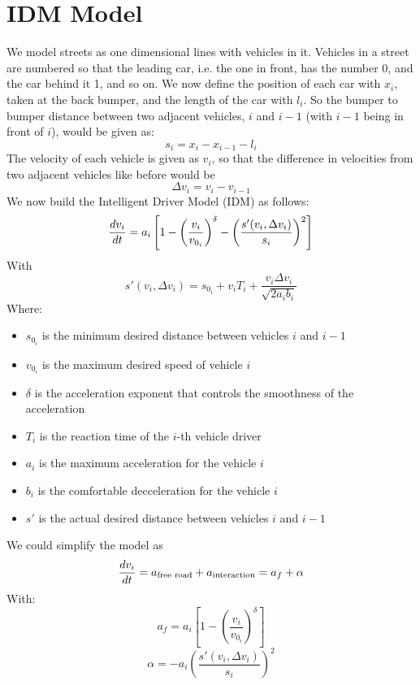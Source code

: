 \documentclass{article}
\begin{document}
\section{IDM Model}
We model streets as one dimensional lines with vehicles in it. Vehicles in a street are numbered so that the leading car, i.e. the one in front, has the number 0, and the car behind it 1, and so on. We now define the position of each car with $x_i$, taken at the back bumper, and the length of the car with $l_i$. So the bumper to bumper distance between two adjacent vehicles, $i$ and $i-1$ (with $i-1$ being in front of $i$), would be given as:
\begin{equation}
    s_i=x_i-x_{i-1}-l_i
    \label{bumper2b-dist}
\end{equation}
The velocity of each vehicle is given as $v_i$, so that the difference in velocities from two adjacent vehicles like before would be
\begin{equation}
    \Delta v_i=v_i-v_{i-1}
    \label{delta-v}
\end{equation}
We now build the Intelligent Driver Model (IDM) as follows:
\begin{equation}
    \frac{dv_i}{dt}=a_i\left[1-\left(\frac{v_i}{v_{0_i}}\right)^\delta-\left(\frac{s'(v_i,\Delta v_i)}{s_i}\right)^2\right]
    \label{IDM-full}
\end{equation}
With
$$s'(v_i,\Delta v_i)=s_{0_i}+v_iT_i+\frac{v_i\Delta v_i}{\sqrt{2a_ib_i}}$$
Where:
\begin{itemize}
    \item $s_{0_i}$ is the minimum desired distance between vehicles $i$ and $i-1$
    \item $v_{0_i}$ is the maximum desired speed of vehicle $i$
    \item $\delta$ is the acceleration exponent that controls the smoothness of the acceleration
    \item $T_i$ is the reaction time of the $i$-th vehicle driver
    \item $a_i$ is the maximum acceleration for the vehicle $i$
    \item $b_i$ is the comfortable decceleration for the vehicle $i$
    \item $s'$ is the actual desired distance between vehicles $i$ and $i-1$
\end{itemize}
We could simplify the model as
$$\frac{dv_i}{dt}=a_{\text{free road}}+a_{\text{interaction}}=a_f+\alpha$$
With:
\begin{equation}
    a_f=a_i\left[1-\left(\frac{v_i}{v_{0_i}}\right)^\delta\right]
    \label{free-road}
\end{equation}
\begin{equation}
    \alpha=-a_i\left(\frac{s'(v_i,\Delta v_i)}{s_i}\right)^2
    \label{interaction}
\end{equation}
\end{document}
